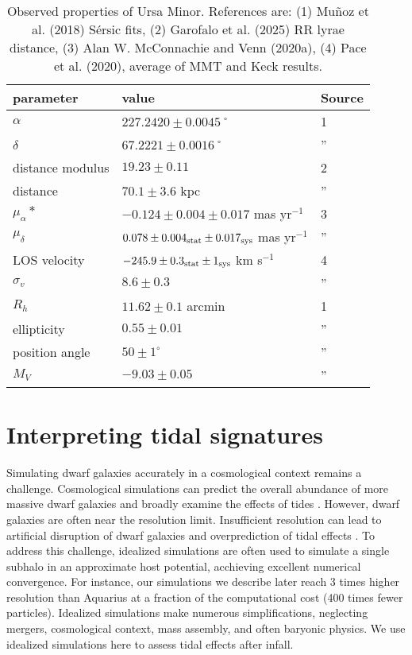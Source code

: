 \begin{table*}[t]
\centering
\caption[Observed Properties of Ursa Minor]{Observed properties of Ursa Minor. References are: (1) Muñoz et al. (2018) Sérsic fits, (2) Garofalo et al. (2025) RR lyrae distance, (3) Alan W. McConnachie and Venn (2020a), (4) Pace et al. (2020), average of MMT and Keck results. }
\label{tbl:umi_obs_props}
\begin{tabular}{lll}
\toprule
parameter & value & Source\\
\midrule
$\alpha$ & $ 227.2420 \pm 0.0045$˚ & 1\\
$\delta$ & $67.2221 \pm 0.0016$˚ & ”\\
distance modulus & $19.23 \pm 0.11$ & 2\\
distance & $70.1 \pm 3.6$ kpc & ”\\
$\mu_\alpha*$ & $-0.124 \pm 0.004 \pm 0.017$ mas yr$^{-1}$ & 3\\
$\mu_\delta$ & $0.078 \pm 0.004_{\rm stat} \pm 0.017_{\rm sys}$ mas yr$^{-1}$ & ”\\
LOS velocity & $-245.9 \pm 0.3_{\rm stat} \pm 1_{\rm sys}$ km s$^{-1}$ & 4\\
$\sigma_v$ & $8.6 \pm 0.3$ & ”\\
$R_h$ & $11.62 \pm 0.1$ arcmin & 1\\
ellipticity & $0.55 \pm 0.01$ & ”\\
position angle & $50 \pm 1^\circ$ & ”\\
$M_V$ & $-9.03 \pm 0.05$ & ”\\
\bottomrule
\end{tabular}
\end{table*}

\section{Interpreting tidal signatures}\label{sec:tidal_theory}

Simulating dwarf galaxies accurately in a cosmological context remains a
challenge. Cosmological simulations can predict the overall abundance of
more massive dwarf galaxies \citep[e.g.,][]{sawala+2016} and broadly
examine the effects of tides \citep[e.g.,][]{riley+2024}. However, dwarf
galaxies are often near the resolution limit. Insufficient resolution
can lead to artificial disruption of dwarf galaxies and overprediction
of tidal effects \citep[e.g.,][]{santos-santos+2025}. To address this
challenge, idealized simulations are often used to simulate a single
subhalo in an approximate host potential, acchieving excellent numerical
convergence. For instance, our simulations we describe later reach 3
times higher resolution than Aquarius \citep{springel+2008} at a
fraction of the computational cost (400 times fewer particles).
Idealized simulations make numerous simplifications, neglecting mergers,
cosmological context, mass assembly, and often baryonic physics. We use
idealized simulations here to assess tidal effects after infall.

